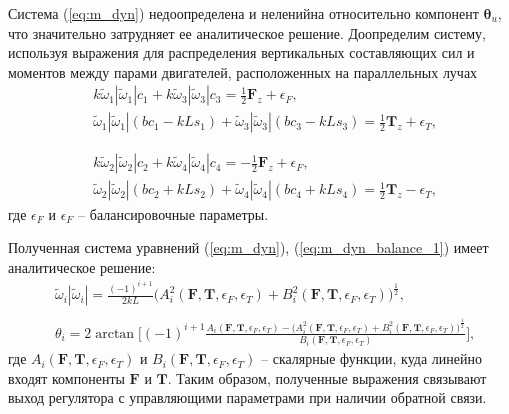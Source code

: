 Система (\ref{eq:m_dyn}) недоопределена и неленийна относительно компонент $\bm \theta_u$, что значительно затрудняет ее аналитическое решение. Доопределим систему, используя выражения для распределения вертикальных составляющих сил и моментов между парами двигателей, расположенных на параллельных лучах
\begin{equation} \label{eq:m_dyn_balance_1}
\begin{aligned}
&k \tilde\omega_1 |\tilde\omega_1| c_1 + k \tilde\omega_3 |\tilde\omega_3| c_3 =
\frac{1}{2} \bm F_z + \epsilon_F,
\\
&\tilde\omega_1 |\tilde\omega_1| (bc_1 - kLs_1)
+ \tilde\omega_3 |\tilde\omega_3| (bc_3 - kLs_3) =
\frac{1}{2} \bm T_z + \epsilon_T,
\end{aligned}
\end{equation}


\begin{equation} \label{eq:m_dyn_balance_2}
\begin{aligned}
&k \tilde\omega_2 |\tilde\omega_2| c_2 + k \tilde\omega_4 |\tilde\omega_4| c_4 =
-\frac{1}{2} \bm F_z + \epsilon_F,
\\
&\tilde\omega_2 |\tilde\omega_2| (bc_2 + kLs_2)
+ \tilde\omega_4 |\tilde\omega_4| (bc_4 + kLs_4) =
\frac{1}{2} \bm T_z - \epsilon_T,
\end{aligned}
\end{equation}
где $\epsilon_F$ и $\epsilon_F$ -- балансировочные параметры.

Полученная система уравнений (\ref{eq:m_dyn}), (\ref{eq:m_dyn_balance_1}) имеет аналитическое решение:
\small
\begin{equation} \label{eq:m_dyn_resolve}
\begin{aligned}
&\tilde\omega_i |\tilde\omega_i| =
\frac{(-1)^{i+1}}{2kL}\Big(
A^2_i(\bm F, \bm T, \epsilon_F, \epsilon_T) + 
B^2_i(\bm F, \bm T, \epsilon_F, \epsilon_T)
\Big)^{\frac{1}{2}},
\\
\phantom{}
\\
&\theta_i = 
2 \arctan \Bigg[(-1)^{i+1}	
\frac{A_i(\bm F, \bm T, \epsilon_F, \epsilon_T) -
\Big(A^2_i(\bm F, \bm T, \epsilon_F, \epsilon_T) +
B^2_i(\bm F, \bm T, \epsilon_F, \epsilon_T)
\Big)^{\frac{1}{2}}}
{B_i(\bm F, \bm T, \epsilon_F, \epsilon_T)}
\Bigg],
\end{aligned}
\end{equation}
\normalsize
где $A_i(\bm F, \bm T, \epsilon_F, \epsilon_T)$ и
$B_i(\bm F, \bm T, \epsilon_F, \epsilon_T)$
-- скалярные функции, куда линейно входят компоненты $\bm F$ и $\bm T$. Таким образом, полученные выражения связывают выход регулятора с управляющими параметрами при наличии обратной связи. 

